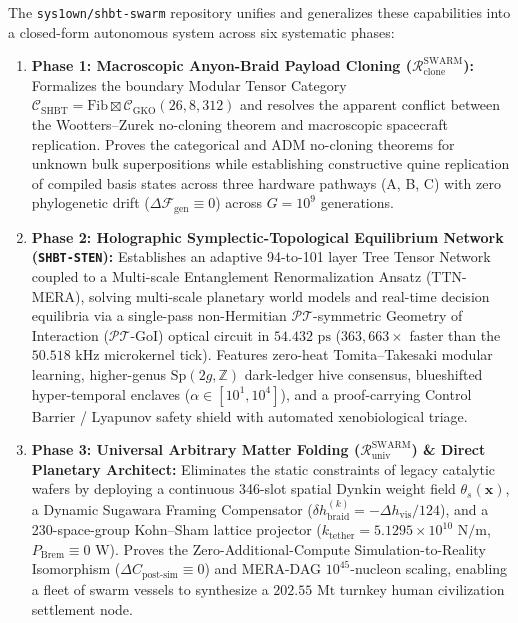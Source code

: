 \documentclass[11pt,onecolumn]{article}
\begin{document}
The \texttt{sys1own/shbt-swarm} repository unifies and generalizes these capabilities into a closed-form autonomous system across six systematic phases:
\begin{enumerate}
    \item \textbf{Phase 1: Macroscopic Anyon-Braid Payload Cloning ($\mathcal{R}_{\text{clone}}^{\text{SWARM}}$):} Formalizes the boundary Modular Tensor Category $\mathcal{C}_{\text{SHBT}} = \text{Fib} \boxtimes \mathcal{C}_{\text{GKO}}(26, 8, 312)$ and resolves the apparent conflict between the Wootters--Zurek no-cloning theorem and macroscopic spacecraft replication. Proves the categorical and ADM no-cloning theorems for unknown bulk superpositions while establishing constructive quine replication of compiled basis states across three hardware pathways (A, B, C) with zero phylogenetic drift ($\Delta\mathcal{F}_{\text{gen}} \equiv 0$) across $G = 10^9$ generations.
    \item \textbf{Phase 2: Holographic Symplectic-Topological Equilibrium Network (\texttt{SHBT-STEN}):} Establishes an adaptive 94-to-101 layer Tree Tensor Network coupled to a Multi-scale Entanglement Renormalization Ansatz (TTN-MERA), solving multi-scale planetary world models and real-time decision equilibria via a single-pass non-Hermitian $\mathcal{PT}$-symmetric Geometry of Interaction ($\mathcal{PT}$-GoI) optical circuit in $54.432\text{ ps}$ ($363{,}663\times$ faster than the $50.518\text{ kHz}$ microkernel tick). Features zero-heat Tomita--Takesaki modular learning, higher-genus $\text{Sp}(2g,\mathbb{Z})$ dark-ledger hive consensus, blueshifted hyper-temporal enclaves ($\alpha \in [10^1, 10^4]$), and a proof-carrying Control Barrier / Lyapunov safety shield with automated xenobiological triage.
    \item \textbf{Phase 3: Universal Arbitrary Matter Folding ($\mathcal{R}_{\text{univ}}^{\text{SWARM}}$) \& Direct Planetary Architect:} Eliminates the static constraints of legacy catalytic wafers by deploying a continuous 346-slot spatial Dynkin weight field $\theta_s(\mathbf{x})$, a Dynamic Sugawara Framing Compensator ($\delta h_{\text{braid}}^{(k)} = -\Delta h_{\text{vis}}/124$), and a 230-space-group Kohn--Sham lattice projector ($k_{\text{tether}} = 5.1295 \times 10^{10}\text{ N/m}$, $P_{\text{Brem}} \equiv 0\text{ W}$). Proves the Zero-Additional-Compute Simulation-to-Reality Isomorphism ($\Delta C_{\text{post-sim}} \equiv 0$) and MERA-DAG $10^{45}$-nucleon scaling, enabling a fleet of swarm vessels to synthesize a $202.55\text{ Mt}$ turnkey human civilization settlement node.

\end{enumerate}
\end{document}
